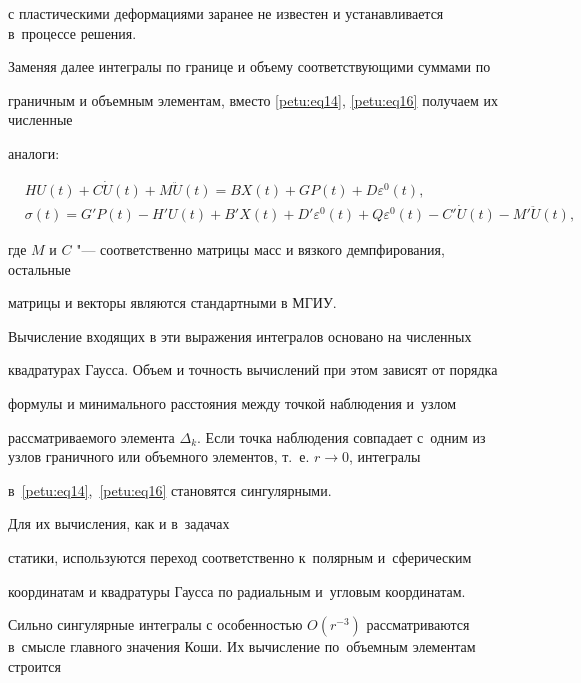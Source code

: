 с пластическими деформациями заранее не известен и устанавливается в~процессе решения.



Заменяя далее интегралы по границе и объему соответствующими суммами по

граничным и объемным элементам, вместо \eqref{petu:eq14}, \eqref{petu:eq16} получаем их численные

аналоги:

\begin{equation}

\label{petu:eq18}

\begin{aligned}

& HU(t)+C\dot {U}(t)+M\ddot {U}(t)=BX(t)+GP(t)+D\varepsilon ^0(t), \\

& \sigma (t)={G}'P(t)-{H}'U(t)+{B}'X(t)+{D}'\varepsilon ^0(t)+Q\varepsilon

^0(t)-{C}'\dot {U}(t)-{M}'\ddot {U}(t),

\end{aligned}

\end{equation}

где $M$ и $C$ "--- соответственно матрицы масс и вязкого демпфирования, остальные

матрицы и векторы являются стандартными в МГИУ.



Вычисление входящих в эти выражения интегралов основано на численных

квадратурах Гаусса. Объем и точность вычислений при этом зависят от порядка

формулы и минимального расстояния между точкой наблюдения и~узлом

рассматриваемого элемента $\Delta _k$. Если точка наблюдения совпадает с~одним из узлов граничного или объемного элементов, т.~е. $r \to 0$, интегралы

в~\eqref{petu:eq14},~\eqref{petu:eq16} становятся сингулярными. 

Для их вычисления, как и в~задачах

статики, используются переход соответственно к~полярным и~сферическим

координатам и квадратуры Гаусса по радиальным и~угловым координатам.



Сильно сингулярные интегралы с особенностью $O(r^{-3})$ рассматриваются в~смысле главного значения Коши. Их вычисление по~объемным элементам строится

